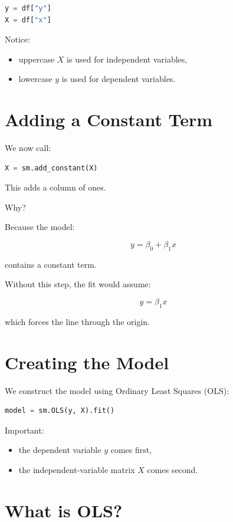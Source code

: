 \documentclass[11pt]{article}
\begin{document}
\begin{lstlisting}[language=Python]
y = df["y"]
X = df["x"]
\end{lstlisting}

Notice:

\begin{itemize}
    \item uppercase \(X\) is used for independent variables,
    \item lowercase \(y\) is used for dependent variables.
\end{itemize}

\section{Adding a Constant Term}

We now call:

\begin{lstlisting}[language=Python]
X = sm.add_constant(X)
\end{lstlisting}

This adds a column of ones.

Why?

Because the model:

\[
y = \beta_0 + \beta_1 x
\]

contains a constant term.

Without this step, the fit would assume:

\[
y = \beta_1 x
\]

which forces the line through the origin.

\section{Creating the Model}

We construct the model using Ordinary Least Squares (OLS):

\begin{lstlisting}[language=Python]
model = sm.OLS(y, X).fit()
\end{lstlisting}

Important:

\begin{itemize}
    \item the dependent variable \(y\) comes first,
    \item the independent-variable matrix \(X\) comes second.
\end{itemize}

\section{What is OLS?}
\end{document}

